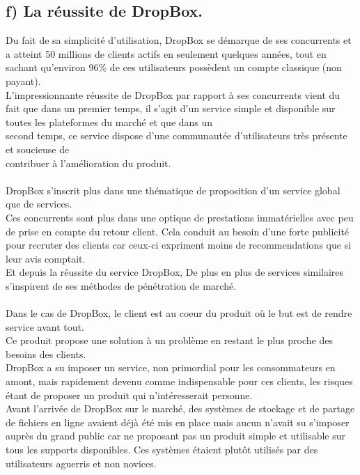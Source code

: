 \documentclass[a4paper, 10pt]{article}
\begin{document}
\subsection*{f) La r\'eussite de DropBox.}
Du fait de sa simplicit\'e d'utilisation, DropBox se d\'emarque de ses concurrents et
a atteint 50 millions de clients actifs en seulement quelques ann\'ees,
tout en sachant qu'environ 96\% de ces utilisateurs poss\`edent un compte classique (non payant).\\
L'impressionnante r\'eussite de DropBox par rapport \`a ses concurrents vient du fait que dans un premier temps,
il s'agit d'un service simple et disponible sur toutes les plateformes du march\'e et
que dans un\\second temps, ce service dispose d'une communaut\'ee d'utilisateurs tr\`es pr\'esente et soucieuse
de\\contribuer \`a l'am\'elioration du produit.\\ \\
DropBox s'inscrit plus dans une th\'ematique de proposition d'un service global que de services.\\
Ces concurrents sont plus dans une optique de prestations immat\'erielles avec peu de prise en compte du retour client.
Cela conduit au besoin d'une forte publicit\'e pour recruter des clients
car ceux-ci expriment moins de recommendations que si leur avis comptait.\\
Et depuis la r\'eussite du service DropBox,
De plus en plus de services similaires s'inspirent de ses m\'ethodes de p\'en\'etration de march\'e.\\ \\
Dans le cas de DropBox, le client est au coeur du produit o\`u le but est de rendre service avant tout.\\
Ce produit propose une solution \`a un probl\`eme en restant le plus proche des besoins des clients.\\
DropBox a su imposer un service, non primordial pour les consommateurs en amont,
mais rapidement devenu comme indispensable pour ces clients, les risques \'etant de proposer un produit qui n'int\'eresserait personne.\\
Avant l'arriv\'ee de DropBox sur le march\'e, des syst\`emes de stockage et de partage de fichiers en ligne avaient d\'ej\`a \'et\'e mis en place
mais aucun n'avait su s'imposer aupr\`es du grand public car ne proposant pas un produit simple et utilisable sur tous les supports disponibles.
Ces syst\`emes \'etaient plut\^ot utilis\'es par des utilisateurs aguerris et non novices.\\ \\
\end{document}

